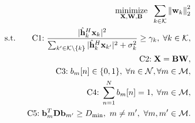 \documentclass[12pt, draftclsnofoot, onecolumn]{IEEEtran}
\DeclareMathOperator{\mino}{minimize}
\begin{document}
\begin{eqnarray}
\label{Ori_Problem}
    &&\hspace*{-4mm}\underset{\mathbf{X},\mathbf{W},\mathbf{B}}{\mino}\hspace*{2mm}\sum_{k\in\mathcal{K}}\left\|\mathbf{w}_k\right\|_2^2\notag\\
    &&\hspace*{2mm}\mbox{s.t.}\hspace*{7mm} \mbox{C1:}\hspace*{1mm} \frac{|\hat{\mathbf{h}}_k^H\mathbf{x}_k|^2}{\sum_{k'\in\mathcal{K}\setminus\{k\}}|\hat{\mathbf{h}}_k^H\mathbf{x}_{k'}|^2+\sigma_{k}^2}\geq \gamma_{k},\hspace*{1mm}\forall k\in \mathcal{K},\notag\\
    &&\hspace*{14mm}\mbox{C2:}\hspace*{1mm}\mathbf{X}=\mathbf{B}\mathbf{W},\notag\\
    &&\hspace*{14mm}\mbox{C3:}\hspace*{1mm} b_m[n]\in \{0,1\},\hspace*{1mm} \forall n\in \mathcal{N}, \forall m\in \mathcal{M},\notag\\
    &&\hspace*{14mm}\mbox{C4:}\hspace*{1mm} \sum_{n=1}^Nb_m[n]=1,\hspace*{1mm}\forall m\in \mathcal{M},\notag\\
    &&\hspace*{14mm}\mbox{C5:}\hspace*{1mm} \mathbf{b}_m^T\mathbf{D}\mathbf{b}_{m'}\geq D_{\mathrm{min}},\ m\neq m',\ \forall m, m'\in\mathcal{M}.
\end{eqnarray}
\end{document}
